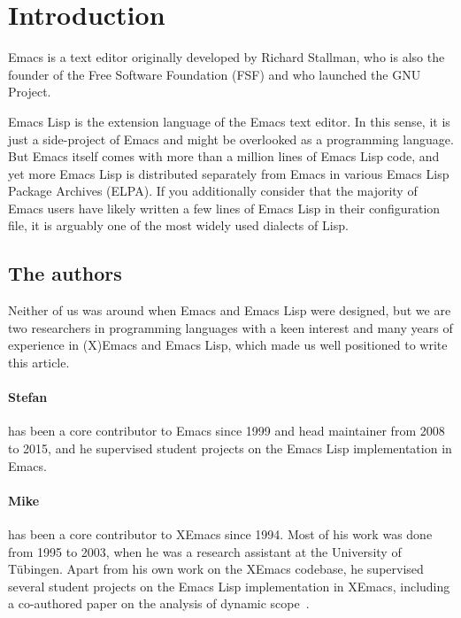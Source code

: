 \documentclass[format=acmsmall, review]{acmart}
\newcommand \Elisp {Emacs Lisp}
\begin{document}
\section{Introduction}

Emacs is a text editor originally developed by Richard Stallman, who is also
the founder of the Free Software Foundation (FSF) and who launched the GNU
Project.

\Elisp{} is the extension language of the Emacs text editor.
In this sense, it is just a side-project of Emacs and might be overlooked as
a programming language.  But Emacs itself comes with more than a million
lines of \Elisp{} code, and yet more \Elisp{} is distributed separately from
Emacs in various Emacs Lisp Package Archives (ELPA).  If you additionally
consider that the majority of Emacs users have likely written a few lines of
\Elisp{} in their configuration file, it is arguably one of the most widely
used dialects of Lisp.


\subsection{The authors}

Neither of us was around when Emacs and \Elisp{} were designed, but we are
two researchers in programming languages with a keen interest and many
years of
experience in (X)Emacs and \Elisp{}, which made us well positioned to write
this article.

\paragraph{Stefan} has been a core contributor to Emacs since
1999 and head maintainer from 2008 to 2015, and he supervised student
projects on the \Elisp{} implementation in Emacs.

\paragraph{Mike} has been a core contributor to XEmacs since 1994.
Most of his work was done from 1995 to 2003, when he was a research
assistant at the University of Tübingen.  Apart from his own work on
the XEmacs codebase, he supervised several student projects on the
\Elisp{} implementation in XEmacs, including a co-authored paper on the
analysis of dynamic scope~\cite{Neubauer01}.
\end{document}
